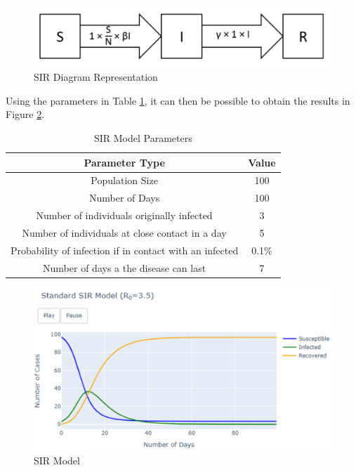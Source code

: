 \begin{figure}[ht!]%
    \centering
    \includegraphics[width=0.75\linewidth]{latex/images/dsir.pdf}
    \caption{SIR Diagram Representation}
    \label{dsir}
\end{figure}

Using the parameters in Table \ref{table:1}, it can then be possible to obtain the results in Figure \ref{sir}.

{
\begin{table}[h!]
\centering
\begin{tabular}{|c|c|}
\hline
Parameter Type & Value \\
\hline
Population Size & 100  \\
Number of Days & 100  \\
Number of individuals originally infected & 3  \\
Number of individuals at close contact in a day & 5 \\
Probability of infection if in contact with an infected & 0.1\% \\
Number of days a the disease can last & 7 \\
\hline
\end{tabular}
\caption{SIR Model Parameters}
\label{table:1}
\end{table}
}


\begin{figure}[ht!]%
    \centering
    \includegraphics[width=0.85\linewidth]{latex/images/sir.pdf}
    \caption{SIR Model}
    \label{sir}
\end{figure}

